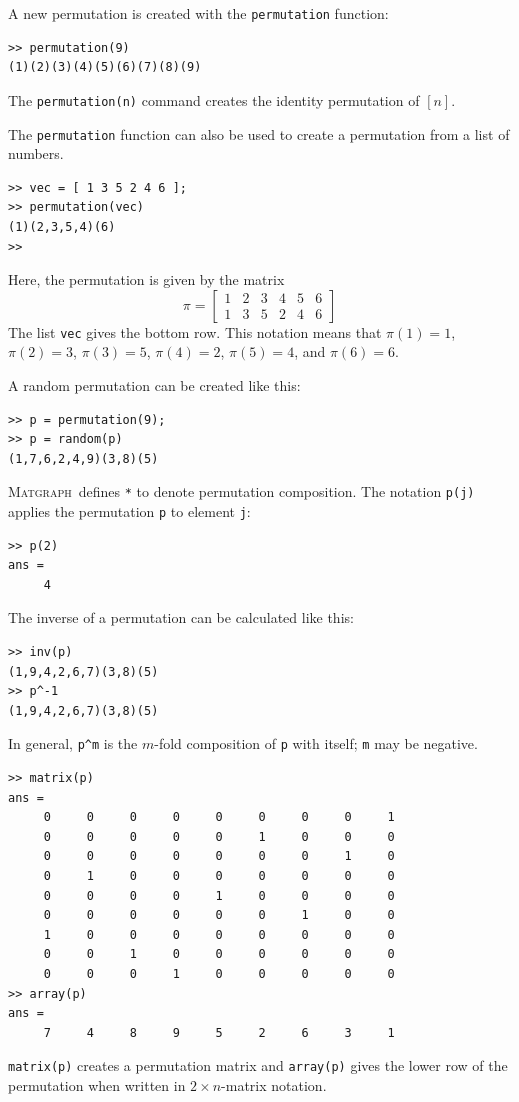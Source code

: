 \documentclass[12pt]{amsart}
\newcommand\matgraph{\textsc{Matgraph}}
\begin{document}
A new permutation is created with the \verb|permutation| function:
\begin{verbatim}
>> permutation(9)
(1)(2)(3)(4)(5)(6)(7)(8)(9)
\end{verbatim}
The \verb|permutation(n)| command creates the identity permutation of
$[n]$. 

The \verb|permutation| function can also be used to create a
permutation from a list of numbers. 
\begin{verbatim}
>> vec = [ 1 3 5 2 4 6 ];
>> permutation(vec)
(1)(2,3,5,4)(6)
>> 
\end{verbatim}
Here, the permutation is given by the matrix
$$
\pi = 
\begin{bmatrix}
  1&2&3&4&5&6 \\
  1&3&5&2&4&6
\end{bmatrix}
$$
The list \verb|vec| gives the bottom row. This notation means that
$\pi(1)=1$, $\pi(2)=3$, $\pi(3)=5$, $\pi(4)=2$, $\pi(5)=4$, and
$\pi(6)=6$. 

A random permutation can be created like this:
\begin{verbatim}
>> p = permutation(9);
>> p = random(p)
(1,7,6,2,4,9)(3,8)(5)
\end{verbatim}

\matgraph\ defines \verb|*| to denote permutation composition. The
notation \verb|p(j)| applies the permutation \verb|p| to element
\verb|j|:
\begin{verbatim}
>> p(2)
ans =
     4
\end{verbatim}

The inverse of a permutation can be calculated like this:
\begin{verbatim}
>> inv(p)
(1,9,4,2,6,7)(3,8)(5)
>> p^-1
(1,9,4,2,6,7)(3,8)(5)
\end{verbatim}
In general, \verb|p^m| is the $m$-fold composition of \verb|p| with
itself; \verb|m| may be negative.

\begin{verbatim}
>> matrix(p)
ans =
     0     0     0     0     0     0     0     0     1
     0     0     0     0     0     1     0     0     0
     0     0     0     0     0     0     0     1     0
     0     1     0     0     0     0     0     0     0
     0     0     0     0     1     0     0     0     0
     0     0     0     0     0     0     1     0     0
     1     0     0     0     0     0     0     0     0
     0     0     1     0     0     0     0     0     0
     0     0     0     1     0     0     0     0     0
>> array(p)
ans =
     7     4     8     9     5     2     6     3     1
\end{verbatim}
\verb|matrix(p)| creates a permutation matrix and \verb|array(p)|
gives the lower row of the permutation when written in $2\times
n$-matrix notation. 
\end{document}
